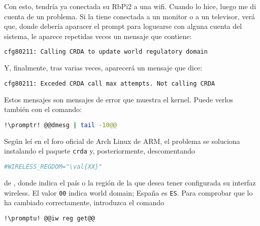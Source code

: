 Con esto, tendría ya conectada su RbPi2 a una wifi. Cuando lo hice, luego me di cuenta de un problema. Si la
tiene conectada a un monitor o a un televisor, verá que, donde debería aparacer el prompt para loguearse con
alguna cuenta del sistema, le aparece repetidas veces un mensaje que contiene:

\begin{lstlisting}[gobble=2,language=bash,style=bashinteract,escapechar=!]
  cfg80211: Calling CRDA to update world regulatory domain
\end{lstlisting}

\noindent Y, finalmente, tras varias veces, aparecerá un mensaje que dice:

\begin{lstlisting}[gobble=2,language=bash,style=bashinteract,escapechar=!]
  cfg80211: Exceded CRDA call max attempts. Not calling CRDA
\end{lstlisting}

Estos mensajes son mensajes de error que muestra el kernel. Puede verlos también con el comando:

\begin{lstlisting}[gobble=2,language=bash,style=bashinteract,escapechar=!]
  !\promptr! @@dmesg | tail -10@@
\end{lstlisting}

Según leí en el foro oficial de Arch Linux de ARM, el problema se soluciona instalando el paquete
\lstinline!crda! y, posteriormente, descomentando

\begin{lstlisting}[gobble=2,language=bash,style=bashinteract,escapechar=!]
  #WIRELESS_REGDOM="\val{XX}"
\end{lstlisting}

\noindent de , donde  indica el país o la región de la que desea tener
configurada su interfaz wireless. El valor \lstinline!00! indica world domain; España es \lstinline!ES!. Para
comprobar que lo ha cambiado correctamente, introduzca el comando

\begin{lstlisting}[gobble=2,language=bash,style=bashinteract,escapechar=!]
  !\promptu! @@iw reg get@@
\end{lstlisting}











